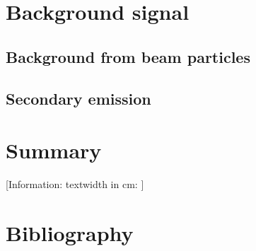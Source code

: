 \begin{refsection}
  \section{Background signal}
  \subsection{Background from beam particles}
  \subsection{Secondary emission}

	\section{Summary}
	\label{ch3:Summary}
	[Information: textwidth in cm: \prntlen{\textwidth}]


	\cleardoublepage
	\section*{Bibliography}
	\label{ch3:bib}
	\printbibliography[heading=subbibliography]

\end{refsection}